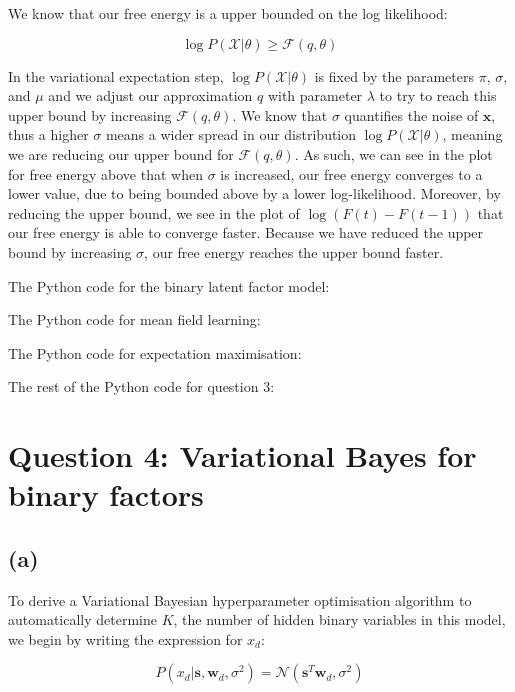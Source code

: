 \documentclass[12pt]{article}
\begin{document}
We know that our free energy is a upper bounded on the log likelihood:

\[\log P(\mathcal{X} | \theta) \geq \mathcal{F}(q, \theta)\]

In the variational expectation step, $\log P(\mathcal{X} | \theta)$ is fixed by the parameters $\pi$, $\sigma$, and $\mu$ and we adjust our approximation $q$ with parameter $\lambda$ to try to reach this upper bound by increasing $\mathcal{F}(q, \theta)$. We know that $\sigma$ quantifies the noise of $\textbf{x}$, thus a higher $\sigma$ means a wider spread in our distribution $\log P(\mathcal{X} | \theta)$, meaning we are reducing our upper bound for $\mathcal{F}(q, \theta)$. As such, we can see in the plot for free energy above that when $\sigma$ is increased, our free energy converges to a lower value, due to being bounded above by a lower log-likelihood. Moreover, by reducing the upper bound, we see in the plot of $\log(F(t)-F(t-1))$ that our free energy is able to converge faster. Because we have reduced the upper bound by increasing $\sigma$, our free energy reaches the upper bound faster.

\newpage
The Python code for the binary latent factor model:


\newpage
The Python code for mean field learning:


\newpage
The Python code for expectation maximisation:



\newpage
The rest of the Python code for question 3:

\newpage
\section*{Question 4: Variational Bayes for binary factors}
\subsection*{(a)}

To derive a Variational Bayesian hyperparameter optimisation algorithm to automatically determine $K$, the number of hidden binary variables in this model, we begin by writing the expression for $x_d$:

\[P(x_d | \textbf{s}, \textbf{w}_d, \sigma^2) = \mathcal{N}\left(\textbf{s}^T\textbf{w}_d, \sigma^2\right)\]
\end{document}
